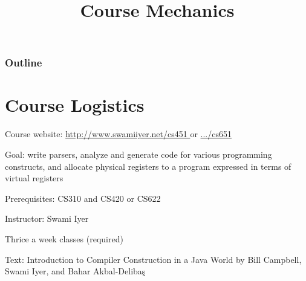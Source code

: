 \documentclass[8pt,a4paper,compress]{beamer}
\title{Course Mechanics}
\date{}
\begin{document}
\begin{frame}
\vfill
\titlepage
\end{frame}

\begin{frame}
\frametitle{Outline}
\tableofcontents
\end{frame}

\section{Course Logistics}
\begin{frame}[fragile]
\pause

Course website: \href{http://www.swamiiyer.net/cs451}{http://www.swamiiyer.net/cs451 \ExternalLink} or \href{http://www.swamiiyer.net/cs651}{.../cs651 \ExternalLink}

\pause
\bigskip

Goal: write parsers, analyze and generate code for various programming constructs, and allocate physical registers to a program expressed in terms of virtual registers

\pause
\bigskip

Prerequisites: CS310 and CS420 or CS622

\pause
\bigskip

Instructor: Swami Iyer

\pause
\bigskip

Thrice a week classes (required)

\pause
\bigskip

Text: Introduction to Compiler Construction in a Java World 
by Bill Campbell, Swami Iyer, and Bahar Akbal-Deliba\c{s}
\end{frame}
\end{document}
